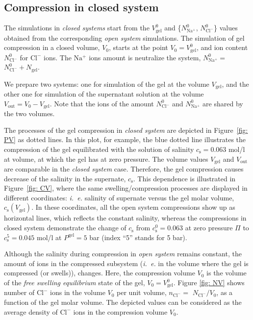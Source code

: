 \documentclass[journal,article,submit,pdftex,moreauthors]{Definitions/mdpi}
\newcommand{\ie}{\textit{i.~e.} }
\newcommand{\ncl}{n_\mathrm{Cl^-}}
\newcommand{\Nna}{N_\mathrm{Na^+}}
\newcommand{\Ncl}{N_\mathrm{Cl^-}}
\newcommand{\gel}{^\mathrm{gel}}
\newcommand{\cl}{\mathrm{Cl^-}}
\newcommand{\na}{\mathrm{Na^+}}
\newcommand{\cs}{c_{\mathrm{s}}}
\newcommand{\Vgel}{V_\mathrm{gel}}
\newcommand{\Ngel}{N_\mathrm{gel}}
\newcommand{\Pgel}{\Pi}
\newcommand{\Vout}{V_\mathrm{out}}
\newcommand{\Vbox}{V_0}
\newcommand{\reffig}[1]{Figure~\ref{#1}}
\begin{document}
\subsection{Compression in closed system}
The simulations in \emph{closed systems} start from the $\Vgel^0$ and \{$\Nna^0$, $\Ncl^0$\} values
obtained from the corresponding \emph{open system} simulations.
The simulation of gel compression in a closed volume, $\Vbox$, starts at the point $\Vbox = \Vgel^0$,
and ion content $\Ncl^0$ for $\cl$ ions. The $\na$ ions amount is neutralize the system, $\Nna^0 = $$\Ncl^0 + \Ngel$.

We prepare two systems: one for simulation of the gel at the volume $\Vgel$,
and the other one for simulation of the supernatant solution at the volume $\Vout = \Vbox - \Vgel$.
Note that the ions of the amount $\Ncl^0$ and $\Nna^0$ are shared by the two volumes. 

The processes of the gel compression in \emph{closed system} are depicted in Figure~\ref{fig: PV} as dotted lines.
In this plot, for example, the blue dotted line illustrates the compression of the gel equilibrated with the solution of salinity $\cs=0.063$ mol/l at volume, at which the gel has at zero pressure. 
The volume values $\Vgel$ and $\Vout$ are comparable in the \emph{closed system} case.
Therefore, the gel compression causes decrease of the salinity in the supernate, $\cs$. 
This dependence is illustrated in \reffig{fig: CV}, where the same swelling/compression processes are displayed in different coordinates: \ie salinity of supernate versus the gel molar volume, $\cs(\Vgel)$.
In these coordinates, all the open system compressions show up as horizontal lines, which reflects the constant salinity, whereas the compressions in closed system demonstrate the change of $\cs$ from $\cs^{0}=0.063$ at zero pressure $\Pgel$ to $\cs^{5}=0.045$ mol/l at $P\gel=5$ bar (index ``5'' stands for 5 bar). 

Although the salinity during compression in \emph{open system} remains constant, the amount of ions in the compressed subsystem (\ie in the volume where the gel is compressed (or swells)), changes.
Here, the compression volume $\Vbox$ is the volume of the \emph{free swelling equilibrium} state of the gel, $\Vbox = \Vgel^0$.
Figure \ref{fig: NV} shows number of $\cl$ ions in the volume $\Vbox$ per unit volume, $\ncl =$ $\Ncl/\Vbox$, as a function of the gel molar volume. 
The depicted values can be considered as the average density of $\cl$ ions in the compression volume $\Vbox$. 
\end{document}
